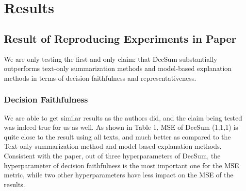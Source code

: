 \documentclass{article}
\begin{document}
\section{Results}

\subsection{Result of Reproducing Experiments in Paper}

We are only testing the first and only claim:
that DecSum substantially outperforms text-only summarization methods and model-based explanation methods in terms of decision faithfulness and representativeness.

\subsubsection{Decision Faithfulness}
We are able to get similar results as the authors did, and the claim being tested was indeed true for us as well.
As shown in Table 1, MSE of DecSum (1,1,1) is quite close to the result using all texts, and much better as compared to the Text-only summarization
method and model-based explanation methods. Consistent with the paper, out of three hyperparameters of DecSum, the hyperparameter of decision faithfulness is the most important one for the MSE metric,
while two other hyperparameters have less impact on the MSE of the results. \\
\end{document}
